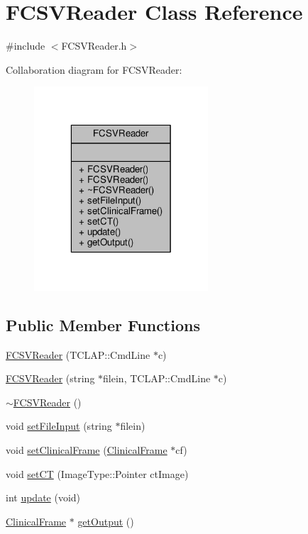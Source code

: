 \hypertarget{classFCSVReader}{\section{F\-C\-S\-V\-Reader Class Reference}
\label{classFCSVReader}
}


{\ttfamily \#include $<$F\-C\-S\-V\-Reader.\-h$>$}



Collaboration diagram for F\-C\-S\-V\-Reader\-:
\nopagebreak
\begin{figure}[H]
\begin{center}
\leavevmode
\includegraphics[width=184pt]{classFCSVReader__coll__graph}
\end{center}
\end{figure}
\subsection*{Public Member Functions}
\begin{DoxyCompactItemize}
\item 
\hyperlink{classFCSVReader_a1b2b7d8b966678d8f808bb3cbce0915b}{F\-C\-S\-V\-Reader} (T\-C\-L\-A\-P\-::\-Cmd\-Line $\ast$c)
\item 
\hyperlink{classFCSVReader_a708da1f7923ad87643797f11d15c2703}{F\-C\-S\-V\-Reader} (string $\ast$filein, T\-C\-L\-A\-P\-::\-Cmd\-Line $\ast$c)
\item 
\hyperlink{classFCSVReader_aafeed39a9516b04df7364564593c948a}{$\sim$\-F\-C\-S\-V\-Reader} ()
\item 
void \hyperlink{classFCSVReader_a47d8fde50cb1506f681fa7bbf464b816}{set\-File\-Input} (string $\ast$filein)
\item 
void \hyperlink{classFCSVReader_a1b056959e112ca1a028ce9ef880ff071}{set\-Clinical\-Frame} (\hyperlink{classClinicalFrame}{Clinical\-Frame} $\ast$cf)
\item 
void \hyperlink{classFCSVReader_ad78a979d3c97883741ad81306540ea69}{set\-C\-T} (Image\-Type\-::\-Pointer ct\-Image)
\item 
int \hyperlink{classFCSVReader_ac5654025633d18b402f0349b33765254}{update} (void)
\item 
\hyperlink{classClinicalFrame}{Clinical\-Frame} $\ast$ \hyperlink{classFCSVReader_a3cee91a10c90ce2310c241ae4fd4d85a}{get\-Output} ()
\end{DoxyCompactItemize}


